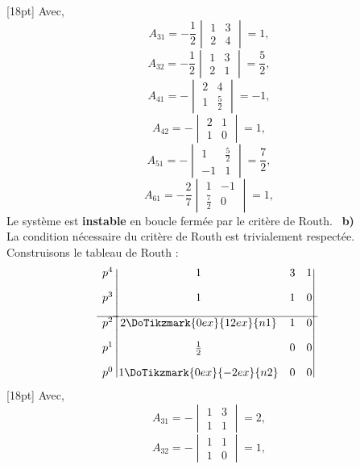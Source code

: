 [18pt]
Avec, 
\[
A_{31}=-\dfrac{1}{2}\begin{vmatrix}1 & 3 \\2&4\end{vmatrix}=1,
\]
\[
A_{32}=-\dfrac{1}{2}\begin{vmatrix}1 & 3 \\2&1\end{vmatrix}=\dfrac{5}{2},
\]
\[
A_{41}=-\begin{vmatrix}2 & 4 \\1&\frac{5}{2}\end{vmatrix}=-1,
\]
\[
A_{42}=-\begin{vmatrix}2 & 1 \\1&0\end{vmatrix}=1,
\]
\[
A_{51}=-\begin{vmatrix}1&\frac{5}{2}\\-1&1\end{vmatrix}=\dfrac{7}{2},
\]
\[
A_{61}=-\dfrac{2}{7}\begin{vmatrix}1 & -1 \\\frac{7}{2}&0\end{vmatrix}=1,
\]
Le système est \textbf{instable} en boucle fermée par le critère de Routh.
\noindent~\textbf{b)}\\
La condition nécessaire du critère de Routh est trivialement respectée.
Construisons le tableau de Routh :
\[
\begin{matrix}
    p^4 \\[1em]
    p^3 \\[1em]
    \hline
    p^2 \\[1em]
    p^1 \\[1em]
    p^0 
\end{matrix}
\begin{vmatrix}
    1      & 3   & 1 \\[1em]
    1      & 1   & 0 \\[1em]
    \hline
    2\DoTikzmark{0ex}{12ex}{n1}   & 1 & 0 \\[1em]
    \frac{1}{2}    & 0  & 0 \\[1em]
    1\DoTikzmark{0ex}{-2ex}{n2}  & 0  &  0 
\end{vmatrix}
\]
[18pt]
Avec, 
\[
A_{31}=-\begin{vmatrix}1 & 3 \\1&1\end{vmatrix}=2,
\]
\[
A_{32}=-\begin{vmatrix}1 & 1 \\1&0\end{vmatrix}=1,
\]
